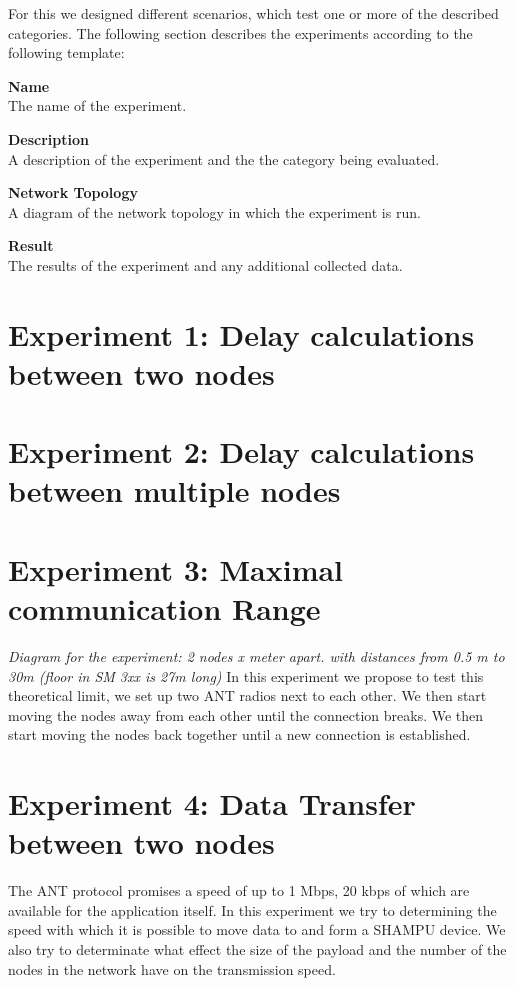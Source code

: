 For this we designed different scenarios, which test one or more of the described categories. The following section describes the experiments according to the following template:

\begin{description}
\item{\textbf{Name}} \hfill \\ The name of the experiment.
\item{\textbf{Description}} \hfill \\ A description of the experiment and the the category being evaluated.
\item{\textbf{Network Topology}} \hfill \\ A diagram of the network topology in which the experiment is run.
\item{\textbf{Result}} \hfill \\ The results of the experiment and any additional collected data.
\end{description}


\section{Experiment 1: Delay calculations between two nodes}

\section{Experiment 2: Delay calculations between multiple nodes}

\section{Experiment 3: Maximal communication Range}
\textit{Diagram for the experiment:  2 nodes   x meter apart.  with distances from 0.5 m to 30m  (floor in SM 3xx is 27m long)}
In this experiment we propose to test this theoretical limit, we set up two ANT radios next to each other. We then start moving the nodes away from each other until the connection breaks. We then start moving the nodes back together until a new connection is established.

\section{Experiment 4: Data Transfer between two nodes}
The ANT protocol promises a speed of up to 1 Mbps, 20 kbps of which are available for the application itself. In this experiment we try to determining the speed with which it is possible to move data to and form a SHAMPU device. We also try to determinate what effect the size of the payload and the number of the nodes in the network have on the transmission speed.


